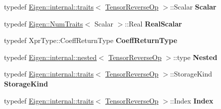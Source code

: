 \begin{DoxyCompactItemize}
typedef \hyperlink{struct_eigen_1_1internal_1_1traits}{Eigen\+::internal\+::traits}$<$ \hyperlink{class_eigen_1_1_tensor_reverse_op}{Tensor\+Reverse\+Op} $>$\+::Scalar {\bfseries Scalar}
\item 
\mbox{\label{class_eigen_1_1_tensor_reverse_op_adf272883f88f102986b29b264d6e5833}} 
typedef \hyperlink{group___core___module_struct_eigen_1_1_num_traits}{Eigen\+::\+Num\+Traits}$<$ Scalar $>$\+::Real {\bfseries Real\+Scalar}
\item 
\mbox{\label{class_eigen_1_1_tensor_reverse_op_a960ec5b095276b6474499a1d2cca3b80}} 
typedef Xpr\+Type\+::\+Coeff\+Return\+Type {\bfseries Coeff\+Return\+Type}
\item 
\mbox{\label{class_eigen_1_1_tensor_reverse_op_a556b97a8fc026f6bc8c0e0004d400682}} 
typedef \hyperlink{struct_eigen_1_1internal_1_1nested}{Eigen\+::internal\+::nested}$<$ \hyperlink{class_eigen_1_1_tensor_reverse_op}{Tensor\+Reverse\+Op} $>$\+::type {\bfseries Nested}
\item 
\mbox{\label{class_eigen_1_1_tensor_reverse_op_a7e7939913a8d01fdbae7e8c930b49180}} 
typedef \hyperlink{struct_eigen_1_1internal_1_1traits}{Eigen\+::internal\+::traits}$<$ \hyperlink{class_eigen_1_1_tensor_reverse_op}{Tensor\+Reverse\+Op} $>$\+::Storage\+Kind {\bfseries Storage\+Kind}
\item 
\mbox{\label{class_eigen_1_1_tensor_reverse_op_adf5c7956449dbb32d43cd30af69e02bc}} 
typedef \hyperlink{struct_eigen_1_1internal_1_1traits}{Eigen\+::internal\+::traits}$<$ \hyperlink{class_eigen_1_1_tensor_reverse_op}{Tensor\+Reverse\+Op} $>$\+::Index {\bfseries Index}
\end{DoxyCompactItemize}
